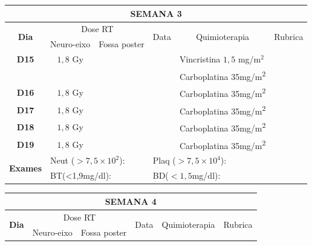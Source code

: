 \documentclass[11pt,a4paper,oldfontcommands]{memoir}
\begin{document}
\begin{center}
\begin{table}[H]
\begin{tabular}{p{1cm}p{2cm}|p{2cm}|p{1cm}|p{4cm}|p{3cm}}
	\hline
	\multicolumn{6}{c}{\textbf{SEMANA 3}}\\
\hline
    \multicolumn{1}{c|}{\multirow{2}{*}{\textbf{Dia}}}&\multicolumn{2}{c|}{Dose RT}&\multicolumn{1}{c|}{\multirow{2}{*}{Data}}&\multicolumn{1}{c|}{\multirow{2}{*}{Quimioterapia}}&\multicolumn{1}{c}{\multirow{2}{*}{Rubrica}} \\
    \cline{2-3}
    \multicolumn{1}{c|}{\multirow{1}{*}{}}&{Neuro-eixo}&{Fossa poster}&& \\
	\hline
	\multicolumn{1}{c|}{\multirow{1}{*}{\textbf{D15}}}&\multicolumn{1}{c|}{\(1,8\) Gy}&&&{Vincristina \(1,5\) mg/m\(^2\)}&\\
	\multicolumn{1}{c|}{\multirow{1}{*}{\textbf{}}}&\multicolumn{1}{c|}{}&&&{Carboplatina 35mg/m\textsuperscript{2}}&\\
    \multicolumn{1}{c|}{\multirow{1}{*}{\textbf{D16}}}&\multicolumn{1}{c|}{\(1,8\) Gy}&&&{Carboplatina 35mg/m\textsuperscript{2}}&\\
    \multicolumn{1}{c|}{\multirow{1}{*}{\textbf{D17}}}&\multicolumn{1}{c|}{\(1,8\) Gy}&&&{Carboplatina 35mg/m\textsuperscript{2}}&\\
    \multicolumn{1}{c|}{\multirow{1}{*}{\textbf{D18}}}&\multicolumn{1}{c|}{\(1,8\) Gy}&&&{Carboplatina 35mg/m\textsuperscript{2}}&\\
    \multicolumn{1}{c|}{\multirow{1}{*}{\textbf{D19}}}&\multicolumn{1}{c|}{\(1,8\) Gy}&&&{Carboplatina 35mg/m\textsuperscript{2}}&\\
    \hline
    \multicolumn{1}{c|}{\multirow{2}{*}{\textbf{Exames}}}&\multicolumn{2}{l|}{Neut (\(>7,5\times10^2\)):}&\multicolumn{2}{l|}{Plaq (\(>7,5\times10^4\)):}&\\
    \cline{2-6}
    \multicolumn{1}{c|}{\multirow{2}{*}{{}}}&\multicolumn{2}{l|}{BT(<1,9mg/dl):}&\multicolumn{2}{l|}{BD(\(<1,5\)mg/dl):}&
    \\
    \hline
\end{tabular}
\end{table}
\begin{table}[H]
\begin{tabular}{p{1cm}p{2cm}|p{2cm}|p{1cm}|p{4cm}|p{3cm}}
	\hline
	\multicolumn{6}{c}{\textbf{SEMANA 4}}\\
\hline
    \multicolumn{1}{c|}{\multirow{2}{*}{\textbf{Dia}}}&\multicolumn{2}{c|}{Dose RT}&\multicolumn{1}{c|}{\multirow{2}{*}{Data}}&\multicolumn{1}{c|}{\multirow{2}{*}{Quimioterapia}}&\multicolumn{1}{c}{\multirow{2}{*}{Rubrica}} \\
    \cline{2-3}
    \multicolumn{1}{c|}{\multirow{1}{*}{}}&{Neuro-eixo}&{Fossa poster}&& \\

\end{tabular}
\end{table}
\end{center}
\end{document}
